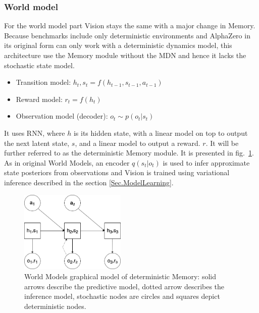 \subsubsection{World model}

For the world model part Vision stays the same with a major change in Memory. Because benchmarks include only deterministic environments and AlphaZero in its original form can only work with a deterministic dynamics model, this architecture use the Memory module without the MDN and hence it lacks the stochastic state model.
\begin{itemize}
\item Transition model:                      $h_t, s_t = f(h_{t-1}, s_{t-1}, a_{t-1})$
\item Reward model:                          $r_t = f(h_t)$
\item Observation model (decoder):           $o_t \sim p(o_t|s_t)$
\end{itemize}
It uses RNN, where $h$ is its hidden state, with a linear model on top to output the next latent state, $s$, and a linear model to output a reward. $r$. It will be further referred to as the deterministic Memory module. It is presented in fig.~\ref{Fig.WorldModelsPGMDet}. \\
As in original World Models, an encoder $q(s_t | o_t)$ is used to infer approximate state posteriors from observations and Vision is trained using variational inference described in the section \ref{Sec.ModelLearning}.

\begin{figure}[H]
\includegraphics[width=0.45\textwidth,keepaspectratio]{figures/WorldModels/prob_graph_model_det.png}
\caption[World Models graphical model of deterministic Memory]{World Models graphical model of deterministic Memory: solid arrows describe the predictive model, dotted arrow describes the inference model, stochastic nodes are circles and squares depict deterministic nodes.}
\label{Fig.WorldModelsPGMDet}
\end{figure}

